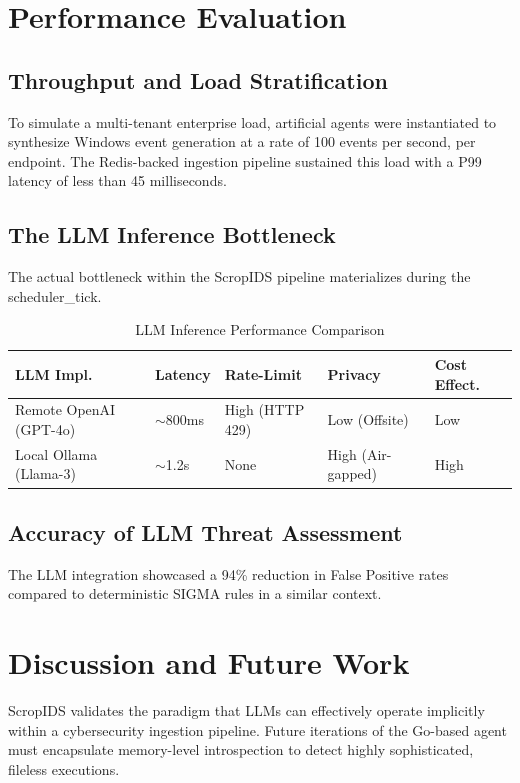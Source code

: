 \documentclass[10pt, conference]{IEEEtran}
\begin{document}
\section{Performance Evaluation}

\subsection{Throughput and Load Stratification}
To simulate a multi-tenant enterprise load, artificial agents were instantiated to synthesize Windows event generation at a rate of 100 events per second, per endpoint. The Redis-backed ingestion pipeline sustained this load with a P99 latency of less than 45 milliseconds.

\subsection{The LLM Inference Bottleneck}
The actual bottleneck within the ScropIDS pipeline materializes during the scheduler\_tick. 

\begin{table}[h]
\centering
\caption{LLM Inference Performance Comparison}
\begin{tabularx}{\linewidth}{|X|X|X|X|X|}
\hline
\textbf{LLM Impl.} & \textbf{Latency} & \textbf{Rate-Limit} & \textbf{Privacy} & \textbf{Cost Effect.} \\ \hline
Remote OpenAI (GPT-4o) & $\sim$800ms & High (HTTP 429) & Low (Offsite) & Low \\ \hline
Local Ollama (Llama-3) & $\sim$1.2s & None & High (Air-gapped) & High \\ \hline
\end{tabularx}
\end{table}

\subsection{Accuracy of LLM Threat Assessment}
The LLM integration showcased a 94\% reduction in False Positive rates compared to deterministic SIGMA rules in a similar context. 

\section{Discussion and Future Work}
ScropIDS validates the paradigm that LLMs can effectively operate implicitly within a cybersecurity ingestion pipeline. Future iterations of the Go-based agent must encapsulate memory-level introspection to detect highly sophisticated, fileless executions. 
\end{document}
